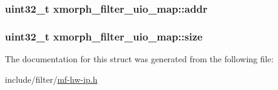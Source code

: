 \subsubsection[{\texorpdfstring{addr}{addr}}]{\setlength{\rightskip}{0pt plus 5cm}uint32\+\_\+t xmorph\+\_\+filter\+\_\+uio\+\_\+map\+::addr}\hypertarget{structxmorph__filter__uio__map_afc5d71f297427642921e2bdc1650db31}{}\label{structxmorph__filter__uio__map_afc5d71f297427642921e2bdc1650db31}
\subsubsection[{\texorpdfstring{size}{size}}]{\setlength{\rightskip}{0pt plus 5cm}uint32\+\_\+t xmorph\+\_\+filter\+\_\+uio\+\_\+map\+::size}\hypertarget{structxmorph__filter__uio__map_a5da76368d6196b966516005fdae05937}{}\label{structxmorph__filter__uio__map_a5da76368d6196b966516005fdae05937}


The documentation for this struct was generated from the following file\+:\begin{DoxyCompactItemize}
\item 
include/filter/\hyperlink{mf-hw-ip_8h}{mf-\/hw-\/ip.\+h}\end{DoxyCompactItemize}
